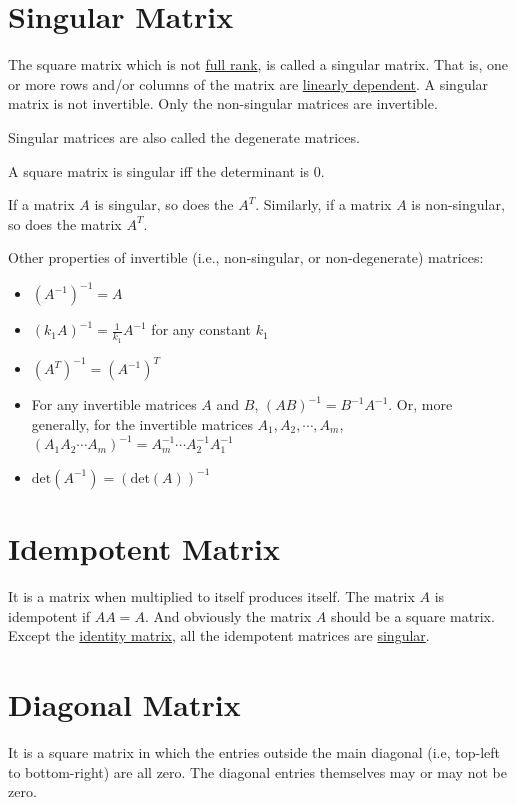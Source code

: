 \documentclass[conference,final,11pt,technote,onecolumn]{IEEEtran}\usepackage[]{graphicx}\usepackage[]{color}
\begin{document}
	\section{Singular Matrix}
	\label{term:singular_matrix}
The square matrix which is not \hyperref[term:rank_of_a_matrix]{full rank}, is called a singular matrix. That is, one or more rows and/or columns of the matrix are \hyperref[term:linearly_independent_vectors]{linearly dependent}. A singular matrix is not invertible. Only the non-singular matrices are invertible.

Singular matrices are also called the degenerate matrices.

A square matrix is singular iff the determinant is 0.

If a matrix $A$ is singular, so does the $A^T$. Similarly, if a matrix $A$ is non-singular, so does the matrix $A^T$.

Other properties of invertible (i.e., non-singular, or non-degenerate) matrices:
\begin{itemize}
\item $(A^{-1})^{-1} = A$
\item $(k_1A)^{-1} = \frac{1}{k_1}A^{-1}$ for any constant $k_1$
\item $(A^T)^{-1} = (A^{-1})^T$
\item For any invertible matrices $A$ and $B$, $(AB)^{-1} = B^{-1}A^{-1}$. Or, more generally, for the invertible matrices $A_1, A_2, \cdots, A_m$, $(A_1A_2\cdots A_m)^{-1} = A^{-1}_m\cdots A^{-1}_2A^{-1}_1$
\item $\text{det}(A^{-1}) = (\text{det}(A))^{-1}$
\end{itemize}
	\section{Idempotent Matrix}
	\label{term:idempotent_matrix}
	It is a matrix when multiplied to itself produces itself\cite{chiang2005fundamental}. The matrix $A$ is idempotent if $AA=A$. And obviously the matrix $A$ should be a square matrix. Except the \hyperref[term:identity_matrix]{identity matrix}, all the idempotent matrices are \hyperref[term:singular_matrix]{singular}. 
	
	\section{Diagonal Matrix}
	\label{term:diagonal_matrix}
It is a square matrix in which the entries outside the main diagonal (i.e, top-left to bottom-right) are all zero. The diagonal entries themselves may or may not be zero.
\end{document}
